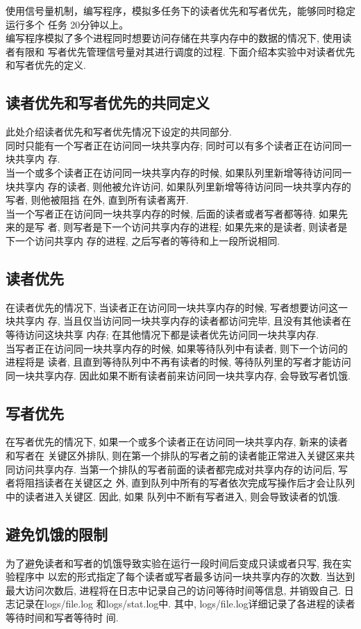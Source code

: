 使用信号量机制，编写程序，模拟多任务下的读者优先和写者优先，能够同时稳定运行多个
任务 20分钟以上。 \\

编写程序模拟了多个进程同时想要访问存储在共享内存中的数据的情况下, 使用读者有限和
写者优先管理信号量对其进行调度的过程. 下面介绍本实验中对读者优先和写者优先的定义.

\subsection{读者优先和写者优先的共同定义}
此处介绍读者优先和写者优先情况下设定的共同部分.\\
同时只能有一个写者正在访问同一块共享内存; 同时可以有多个读者正在访问同一块共享内
存. \\

当一个或多个读者正在访问同一块共享内存的时候, 如果队列里新增等待访问同一块共享内
存的读者, 则他被允许访问, 如果队列里新增等待访问同一块共享内存的写者, 则他被阻挡
在外, 直到所有读者离开. \\

当一个写者正在访问同一块共享内存的时候, 后面的读者或者写者都等待. 如果先来的是写
者, 则写者是下一个访问共享内存的进程; 如果先来的是读者, 则读者是下一个访问共享内
存的进程, 之后写者的等待和上一段所说相同.

\subsection{读者优先}
在读者优先的情况下, 当读者正在访问同一块共享内存的时候, 写者想要访问这一块共享内
存, 当且仅当访问同一块共享内存的读者都访问完毕, 且没有其他读者在等待访问这块共享
内存; 在其他情况下都是读者优先访问同一块共享内存.\\

当写者正在访问同一块共享内存的时候, 如果等待队列中有读者, 则下一个访问的进程将是
读者, 且直到等待队列中不再有读者的时候, 等待队列里的写者才能访问同一块共享内存.
因此如果不断有读者前来访问同一块共享内存, 会导致写者饥饿.

\subsection{写者优先}
在写者优先的情况下, 如果一个或多个读者正在访问同一块共享内存, 新来的读者和写者在
关键区外排队, 则在第一个排队的写者之前的读者能正常进入关键区来共同访问共享内存.
当第一个排队的写者前面的读者都完成对共享内存的访问后, 写者将阻挡读者在关键区之
外, 直到队列中所有的写者依次完成写操作后才会让队列中的读者进入关键区. 因此, 如果
队列中不断有写者进入, 则会导致读者的饥饿. \\

\subsection{避免饥饿的限制}
为了避免读者和写者的饥饿导致实验在运行一段时间后变成只读或者只写, 我在实验程序中
以宏的形式指定了每个读者或写者最多访问一块共享内存的次数. 当达到最大访问次数后,
进程将在日志中记录自己的访问等待时间等信息, 并销毁自己. 日志记录在logs/file.log
和logs/stat.log中. 其中, logs/file.log详细记录了各进程的读者等待时间和写者等待时
间.
